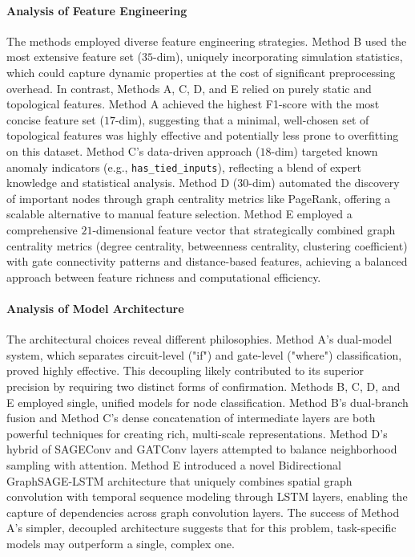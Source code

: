 \documentclass[conference]{IEEEtran}
\begin{document}
\paragraph{Analysis of Feature Engineering}
The methods employed diverse feature engineering strategies. Method B used the most extensive feature set ($35$-dim), uniquely incorporating simulation statistics, which could capture dynamic properties at the cost of significant preprocessing overhead. In contrast, Methods A, C, D, and E relied on purely static and topological features. Method A achieved the highest F1-score with the most concise feature set ($17$-dim), suggesting that a minimal, well-chosen set of topological features was highly effective and potentially less prone to overfitting on this dataset. Method C's data-driven approach ($18$-dim) targeted known anomaly indicators (e.g., \texttt{has\_tied\_inputs}), reflecting a blend of expert knowledge and statistical analysis. Method D ($30$-dim) automated the discovery of important nodes through graph centrality metrics like PageRank, offering a scalable alternative to manual feature selection. Method E employed a comprehensive $21$-dimensional feature vector that strategically combined graph centrality metrics (degree centrality, betweenness centrality, clustering coefficient) with gate connectivity patterns and distance-based features, achieving a balanced approach between feature richness and computational efficiency.

\paragraph{Analysis of Model Architecture}
The architectural choices reveal different philosophies. Method A's dual-model system, which separates circuit-level ("if") and gate-level ("where") classification, proved highly effective. This decoupling likely contributed to its superior precision by requiring two distinct forms of confirmation. Methods B, C, D, and E employed single, unified models for node classification. Method B's dual-branch fusion and Method C's dense concatenation of intermediate layers are both powerful techniques for creating rich, multi-scale representations. Method D's hybrid of SAGEConv and GATConv layers attempted to balance neighborhood sampling with attention. Method E introduced a novel Bidirectional GraphSAGE-LSTM architecture that uniquely combines spatial graph convolution with temporal sequence modeling through LSTM layers, enabling the capture of dependencies across graph convolution layers. The success of Method A's simpler, decoupled architecture suggests that for this problem, task-specific models may outperform a single, complex one.
\end{document}
